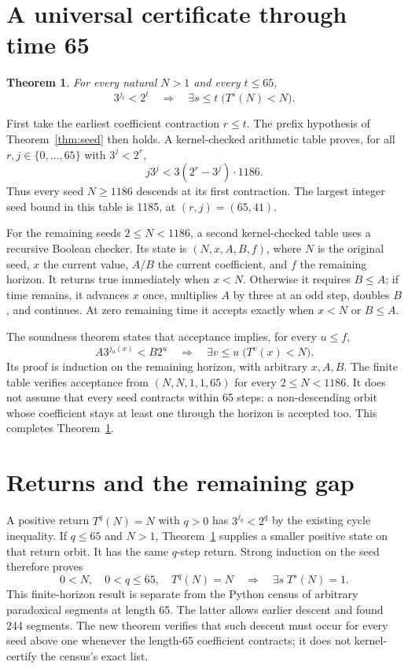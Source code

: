 \documentclass[10pt]{article}
\newtheorem{theorem}{Theorem}
\begin{document}
\section{A universal certificate through time 65}
\begin{theorem}\label{thm:finite}
For every natural $N>1$ and every $t\le65$,
\[
3^{j_t}<2^t\quad\Longrightarrow\quad
\exists s\le t\;\bigl(T^s(N)<N\bigr).
\]
\end{theorem}
First take the earliest coefficient contraction $r\le t$. The prefix
hypothesis of Theorem~\ref{thm:seed} then holds. A kernel-checked arithmetic
table proves, for all $r,j\in\{0,\ldots,65\}$ with $3^j<2^r$,
\[
j3^j<3(2^r-3^j)\cdot1186.
\]
Thus every seed $N\ge1186$ descends at its first contraction. The largest
integer seed bound in this table is 1185, at $(r,j)=(65,41)$.

For the remaining seeds $2\le N<1186$, a second kernel-checked table uses
a recursive Boolean checker. Its state is $(N,x,A,B,f)$, where $N$ is the
original seed, $x$ the current value, $A/B$ the current coefficient, and
$f$ the remaining horizon. It returns true immediately when $x<N$.
Otherwise it requires $B\le A$; if time remains, it advances $x$ once,
multiplies $A$ by three at an odd step, doubles $B$, and continues.
At zero remaining time it accepts exactly when $x<N$ or $B\le A$.

The soundness theorem states that acceptance implies, for every $u\le f$,
\[
A3^{j_u(x)}<B2^u\quad\Longrightarrow\quad
\exists v\le u\;\bigl(T^v(x)<N\bigr).
\]
Its proof is induction on the remaining horizon, with arbitrary $x,A,B$.
The finite table verifies acceptance from $(N,N,1,1,65)$ for every
$2\le N<1186$. It does not assume that every seed contracts within 65
steps: a non-descending orbit whose coefficient stays at least one through
the horizon is accepted too. This completes Theorem~\ref{thm:finite}.

\section{Returns and the remaining gap}
A positive return $T^q(N)=N$ with $q>0$ has $3^{j_q}<2^q$ by the existing
cycle inequality. If $q\le65$ and $N>1$, Theorem~\ref{thm:finite} supplies
a smaller positive state on that return orbit. It has the same $q$-step
return. Strong induction on the seed therefore proves
\[
0<N,\quad 0<q\le65,\quad T^q(N)=N
\quad\Longrightarrow\quad\exists s\;T^s(N)=1.
\]
This finite-horizon result is separate from the Python census of arbitrary
paradoxical segments at length 65. The latter allows earlier descent and
found 244 segments. The new theorem verifies that such descent must occur
for every seed above one whenever the length-65 coefficient contracts;
it does not kernel-certify the census's exact list.
\end{document}
